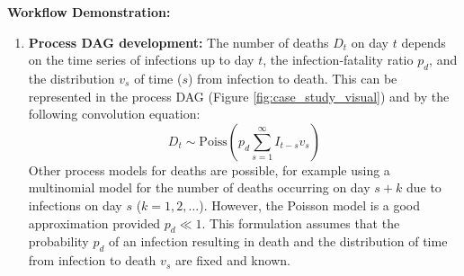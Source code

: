 \documentclass{article}
\begin{document}
\textbf{Workflow Demonstration:}
\begin{enumerate}
    \item \textbf{Process DAG development:} The number of deaths $D_t$ on day $t$ depends on the time series of infections up to day $t$, the infection-fatality ratio $p_d$, and the distribution $v_s$ of time ($s$) from infection to death. This can be represented in the process DAG (Figure \ref{fig:case_study_visual}) and by the following convolution equation:
    \begin{equation} \label{eq:deaths}
        D_t \sim \mathrm{Poiss}\left(p_d \sum_{s=1}^\infty I_{t-s}v_s \right)
    \end{equation}
    Other process models for deaths are possible, for example using a multinomial model for the number of deaths occurring on day $s+k$ due to infections on day $s$ ($k=1,2,\ldots$). However, the Poisson model is a good approximation provided $p_d\ll 1$. This formulation assumes that the probability $p_d$ of an infection resulting in death and the distribution of time from infection to death $v_s$ are fixed and known.
    

\end{enumerate}
\end{document}

